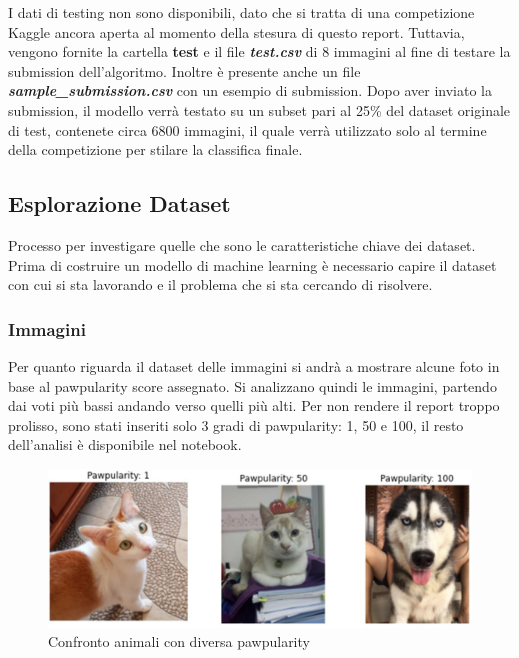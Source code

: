     I dati di testing non sono disponibili, dato che si tratta di una competizione Kaggle ancora aperta al momento della stesura di questo report. Tuttavia, vengono fornite la cartella \textbf{test} e il file \textbf{\textit{test.csv}} di 8 immagini al fine di testare la submission dell'algoritmo.
    Inoltre è presente anche un file \textbf{\textit{sample\_submission.csv}} con un esempio di submission. Dopo aver inviato la submission, il modello verrà testato su un subset pari al 25\% del dataset originale di test, contenete circa 6800 immagini, il quale verrà utilizzato solo al termine della competizione per stilare la classifica finale.

    
    \subsection{Esplorazione Dataset}
    Processo per investigare quelle che sono le caratteristiche chiave dei dataset. Prima di costruire un modello di machine learning è necessario capire il dataset con cui si sta lavorando e il problema che si sta cercando di risolvere.

    \subsubsection{Immagini}
    Per quanto riguarda il dataset delle immagini si andrà a mostrare alcune foto in base al pawpularity score assegnato.
    Si analizzano quindi le immagini, partendo dai voti più bassi andando verso quelli più alti. Per non rendere il report troppo prolisso, sono stati inseriti solo 3 gradi di pawpularity: 1, 50 e 100, il resto dell'analisi è disponibile nel notebook.
    
    \begin{figure}[H]
        \centering
        \includegraphics[scale=0.7]{Plot/pawpularity_preview.jpg}
        \caption{Confronto animali con diversa pawpularity}
        \label{fig:paw_10}
    \end{figure}

